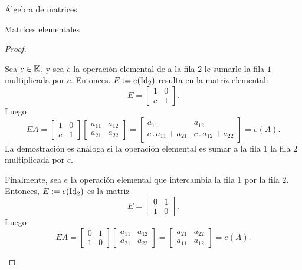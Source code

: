 \begin{chapter}{\'Algebra de matrices}
\begin{section}{Matrices elementales}
\begin{proof}
\begin{enumelem}
                    \item Sea  $c \in \mathbb K$, y  sea $e$ la operación elemental de a la fila $2$ le sumarle  la fila $1$ multiplicada por $c$. Entonces. $E:=e(\operatorname{Id}_2)$ resulta en la matriz elemental: 
                    \begin{equation*}
                    E=\begin{bmatrix} 1& 0\\ c&1\end{bmatrix}.
                    \end{equation*}
                    Luego 
                    \begin{equation*}
                    EA= \begin{bmatrix} 1& 0\\ c&1\end{bmatrix}    \begin{bmatrix} a_{11}&a_{12}\\a_{21}&a_{22}\end{bmatrix} = 
                    \begin{bmatrix} 
                    a_{11} &a_{12}\\
                    c\,.\,a_{11} + a_{21}&c\,.\,a_{12}+a_{22}\end{bmatrix} = e(A).
                    \end{equation*}
                    La demostración es análoga si la operación elemental es sumar a la fila $1$ la fila $2$ multiplicada por $c$.
                    
                    \item  Finalmente, sea $e$ la operación elemental que intercambia la fila $1$ por la fila $2$. Entonces,  $E:=e(\operatorname{Id}_2)$ es la matriz 
                    \begin{equation*}
                    E=\begin{bmatrix} 0& 1\\ 1&0\end{bmatrix}.
                    \end{equation*}
                    Luego
                    \begin{equation*}
                    EA= \begin{bmatrix} 0& 1\\ 1&0\end{bmatrix}    \begin{bmatrix} a_{11}&a_{12}\\a_{21}&a_{22}\end{bmatrix} = 
                    \begin{bmatrix}
                    a_{21} &a_{22}\\
                    a_{11} &a_{12}\end{bmatrix} = e(A).
                    \end{equation*}
                \end{enumelem}
                

\end{proof}
\end{section}
\end{chapter}
